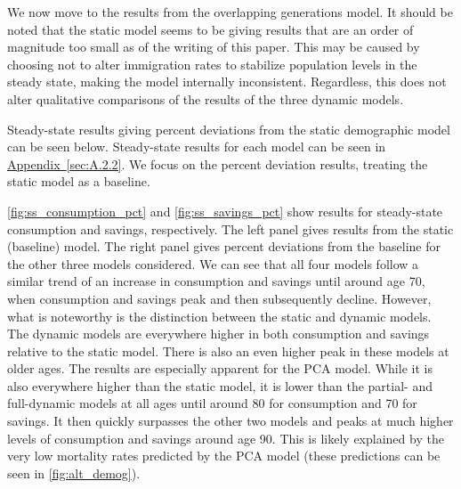 \documentclass[10pt]{article}
\renewcommand{\thesection}{\arabic{section}}
\renewcommand{\thesubsection}{\thesection.\arabic{subsection}}
\newcommand{\aref}[1]{\hyperref[#1]{Appendix~\ref{#1}}}
\renewcommand{\section}[2][]{\oldsection[#1]{#2}\index{#1}\label{sec:\thesection}}
\renewcommand{\subsection}[2][]{\oldsubsection[#1]{#2}\index{#1}\label{sec:\thesubsection}}
\numberwithin{equation}{subsection}
\begin{document}
\par We now move to the results from the overlapping generations model. It should be noted that the static model seems to be giving results that are an order of magnitude too small as of the writing of this paper. This may be caused by choosing not to alter immigration rates to stabilize population levels in the steady state, making the model internally inconsistent. Regardless, this does not alter qualitative comparisons of the results of the three dynamic models.

\subsection{Steady-State}

\par Steady-state results giving percent deviations from the static demographic model can be seen below. Steady-state results for each model can be seen in \aref{sec:A.2.2}. We focus on the percent deviation results, treating the static model as a baseline.

\par \autoref{fig:ss_consumption_pct} and \autoref{fig:ss_savings_pct} show results for steady-state consumption and savings, respectively. The left panel gives results from the static (baseline) model. The right panel gives percent deviations from the baseline for the other three models considered. We can see that all four models follow a similar trend of an increase in consumption and savings until around age 70, when consumption and savings peak and then subsequently decline. However, what is noteworthy is the distinction between the static and dynamic models. The dynamic models are everywhere higher in both consumption and savings relative to the static model. There is also an even higher peak in these models at older ages. The results are especially apparent for the PCA model. While it is also everywhere higher than the static model, it is lower than the partial- and full-dynamic models at all ages until around 80 for consumption and 70 for savings. It then quickly surpasses the other two models and peaks at much higher levels of consumption and savings around age 90. This is likely explained by the very low mortality rates predicted by the PCA model (these predictions can be seen in \autoref{fig:alt_demog}).
\end{document}
